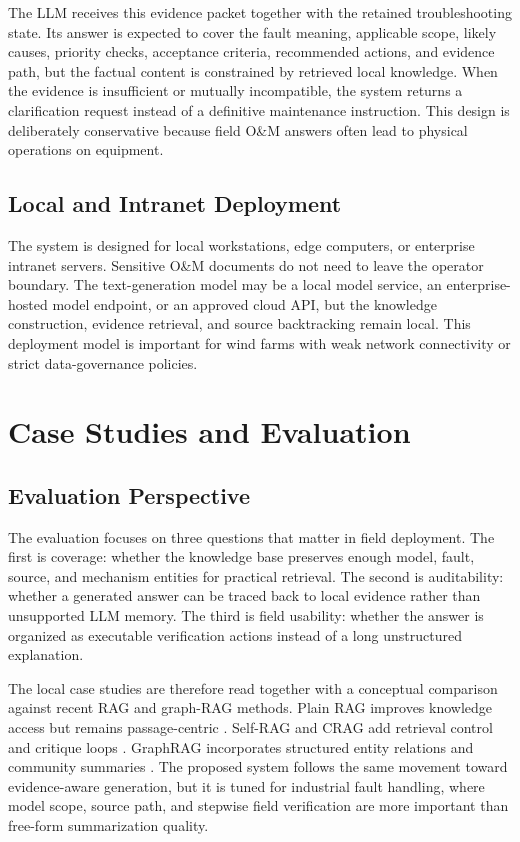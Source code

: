 \documentclass[lettersize,journal]{IEEEtran}
\begin{document}
The LLM receives this evidence packet together with the retained troubleshooting state. Its answer is expected to cover the fault meaning, applicable scope, likely causes, priority checks, acceptance criteria, recommended actions, and evidence path, but the factual content is constrained by retrieved local knowledge. When the evidence is insufficient or mutually incompatible, the system returns a clarification request instead of a definitive maintenance instruction. This design is deliberately conservative because field O\&M answers often lead to physical operations on equipment.

\subsection{Local and Intranet Deployment}
The system is designed for local workstations, edge computers, or enterprise intranet servers. Sensitive O\&M documents do not need to leave the operator boundary. The text-generation model may be a local model service, an enterprise-hosted model endpoint, or an approved cloud API, but the knowledge construction, evidence retrieval, and source backtracking remain local. This deployment model is important for wind farms with weak network connectivity or strict data-governance policies.

\section{Case Studies and Evaluation}
\subsection{Evaluation Perspective}
The evaluation focuses on three questions that matter in field deployment. The first is coverage: whether the knowledge base preserves enough model, fault, source, and mechanism entities for practical retrieval. The second is auditability: whether a generated answer can be traced back to local evidence rather than unsupported LLM memory. The third is field usability: whether the answer is organized as executable verification actions instead of a long unstructured explanation.

The local case studies are therefore read together with a conceptual comparison against recent RAG and graph-RAG methods. Plain RAG improves knowledge access but remains passage-centric \cite{lewis2020rag,zhao2024ragSurvey}. Self-RAG and CRAG add retrieval control and critique loops \cite{asai2023selfrag,yan2024crag}. GraphRAG incorporates structured entity relations and community summaries \cite{edge2024graphrag}. The proposed system follows the same movement toward evidence-aware generation, but it is tuned for industrial fault handling, where model scope, source path, and stepwise field verification are more important than free-form summarization quality.
\end{document}

